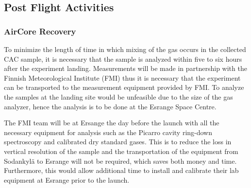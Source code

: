 \subsection{Post Flight Activities}

\subsubsection{AirCore Recovery}
To minimize the length of time in which mixing of the gas occurs in the collected CAC sample, it is necessary that the sample is analyzed within five to six hours after the experiment landing. Measurements will be made in partnership with the Finnish Meteorological Institute (FMI) thus it is necessary that the experiment can be transported to the measurement equipment provided by FMI. To analyze the samples at the landing site would be unfeasible due to the size of the gas analyzer, hence the analysis is to be done at the Esrange Space Centre.


The FMI team will be at Ersange the day before the launch with all the necessary equipment for analysis such as the Picarro cavity ring-down spectroscopy and calibrated dry standard gases. This is to reduce the loss in vertical resolution of the sample and the  transportation of the equipment from Sodankylä to Esrange will not be required, which saves both money and time. Furthermore, this would allow additional time to install and calibrate their lab equipment at Esrange prior to the launch.

